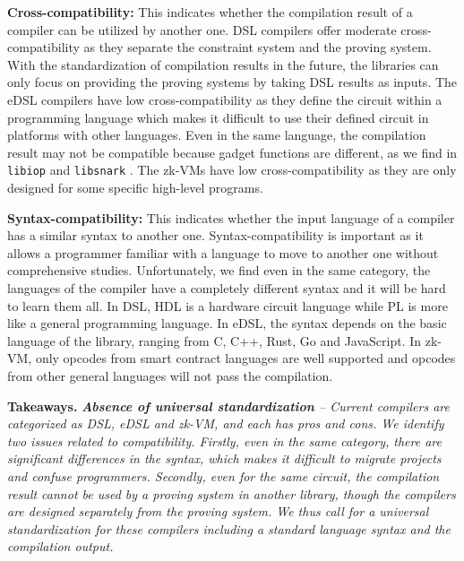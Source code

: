 \documentclass[letterpaper,twocolumn,10pt]{article}
\theoremstyle{definition}
\newcommand{\mypara}[1]{\noindent\textbf{{#1: }}}
\newcommand{\new}[1]{{#1}\xspace}
\newcommand{\lib}[1]{\texttt{#1}\xspace}
\newenvironment{takeaway}[1][]
  {
 \begin{tcolorbox}
 [%
    enhanced, 
    breakable,
    boxrule=0.5pt,
    arc=4pt,
    left=2pt,
    right=2pt,
    bottom=2pt,
    top=2pt,
    rounded corners
    ]{}
  \textbf{#1.}
  \small \itshape}
  {
\end{tcolorbox}
}
\begin{document}
\new{
	\mypara{Cross-compatibility} This indicates whether the compilation result of a compiler can be utilized by another one. DSL compilers offer moderate cross-compatibility as they separate the constraint system and the proving system. With the standardization of compilation results in the future, the libraries can only focus on providing the proving systems by taking DSL results as inputs. The eDSL compilers have low cross-compatibility as they define the circuit within a programming language which makes it difficult to use their defined circuit in platforms with other languages. Even in the same language, the compilation result may not be compatible because gadget functions are different, as we find in \lib{libiop} \cite{libiop} and \lib{libsnark} \cite{libsnark}. The zk-VMs have low cross-compatibility as they are only designed for some specific high-level programs. 
	
	\mypara{Syntax-compatibility} This indicates whether the input language of a compiler has a similar syntax to another one. Syntax-compatibility is important as it allows a programmer familiar with a language to move to another one without comprehensive studies. Unfortunately, we find even in the same category, the languages of the compiler have a completely different syntax and it will be hard to learn them all. In DSL, HDL is a hardware circuit language while PL is more like a general programming language. In eDSL, the syntax depends on the basic language of the library, ranging from C, C++, Rust, Go and JavaScript. In zk-VM, only opcodes from smart contract languages are well supported and opcodes from other general languages will not pass the compilation.
}

\begin{takeaway}[Takeaways]
	\textbf{\new{Absence of universal standardization}} -- \new{Current compilers are categorized as DSL, eDSL and zk-VM, and each has pros and cons. We identify two issues related to compatibility.
		Firstly, even in the same category, there are significant differences in the syntax, which makes it difficult to migrate projects and confuse programmers. Secondly, even for the same circuit, the compilation result cannot be used by a proving system in another library, though the compilers are designed separately from the proving system. We thus call for a universal standardization for these compilers including a standard language syntax and the compilation output.} 
\end{takeaway}
\end{document}
